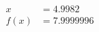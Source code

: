 \documentclass[preview]{standalone}
\begin{document}
\begin{align*}
x &= 4.9982\\f(x) &= 7.9999996
\end{align*}
\end{document}
